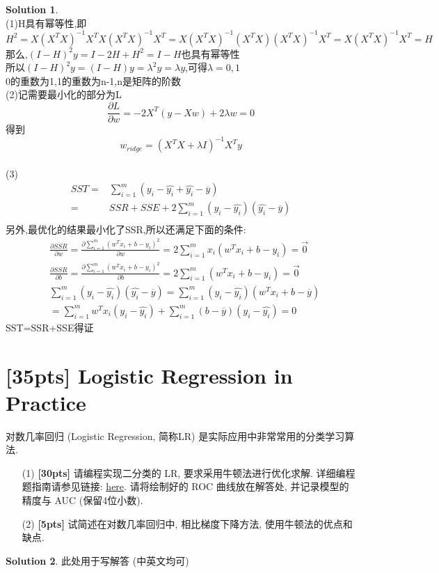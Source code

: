 \documentclass[a4paper,UTF8]{article}
\numberwithin{equation}{section}
\theoremstyle{definition}
\newtheorem*{solution}{Solution}
\begin{document}
\begin{solution}
	~\\
	(1)H具有幂等性,即$H^2=X(X^T X)^{-1}X^T X(X^T X)^{-1}X^T=X (X^T X)^{-1} (X^T X) (X^T X)^{-1} X^T=X (X^T X)^{-1} X^T=H$\\
	那么,$(I-H)^2 y=I-2H+H^2=I-H$也具有幂等性\\
	所以$(I-H)^2 y=(I-H)y=\lambda^2 y=\lambda y$,可得$\lambda=0,1$\\
	0的重数为1,1的重数为n-1,n是矩阵的阶数\\
	(2)记需要最小化的部分为L\\
	$$\frac{\partial L}{\partial w}=-2X^T (y-Xw)+2\lambda w=0$$
	得到$$w_{ridge}=(X^TX+\lambda I)^{-1} X^T y$$\\
	(3)\begin{align*}
		SST=&\sum_{i=1}^{m}(y_i-\hat {y_i}+\hat{y_i}-\overline{y})\\
		=&SSR+SSE+2\sum_{i=1}^{m}(y_i-\hat {y_i})(\hat{y_i}-\overline{y})\\
	\end{align*}
	另外,最优化的结果最小化了SSR,所以还满足下面的条件:\\
	\begin{align*}
		&\frac{\partial SSR}{\partial w}=\frac{\partial \sum_{i=1}^{m}(w^T x_i+b-y_i)^2}{\partial w}=2\sum_{i=1}^{m}x_i(w^T x_i+b-y_i)=\vec{0}\\
		&\frac{\partial SSR}{\partial b}=\frac{\partial \sum_{i=1}^{m}(w^T x_i+b-y_i)^2}{\partial b}=2\sum_{i=1}^{m}(w^T x_i+b-y_i)=\vec{0}\\
		&\sum_{i=1}^{m}(y_i-\hat {y_i})(\hat{y_i}-\overline{y})=\sum_{i=1}^{m}(y_i-\hat {y_i})(w^T x_i+b-\overline{y})\\
		&=\sum_{i=1}^{m}w^T x_i(y_i-\hat {y_i})+\sum_{i=1}^{m}(b-\overline{y})(y_i-\hat {y_i})=0
	\end{align*}
	SST=SSR+SSE得证
\end{solution}

\newpage
\section{[35pts] Logistic Regression in Practice}
对数几率回归 (Logistic Regression, 简称LR) 是实际应用中非常常用的分类学习算法.
\begin{enumerate}
    \item[(1)]  \textbf{[30pts]} 请编程实现二分类的 LR, 要求采用牛顿法进行优化求解. 详细编程题指南请参见链接: \href{https://www.lamda.nju.edu.cn/ML2023Spring/homework/hw1/hw1-code.html}{here}. 请将绘制好的 ROC 曲线放在解答处, 并记录模型的精度与 AUC (保留4位小数).
    \item[(2)]  \textbf{[5pts]} 试简述在对数几率回归中, 相比梯度下降方法, 使用牛顿法的优点和缺点.
\end{enumerate}

\begin{solution}
此处用于写解答 (中英文均可)
~\\
~\\
~\\
~\\
\end{solution}
\end{document}
